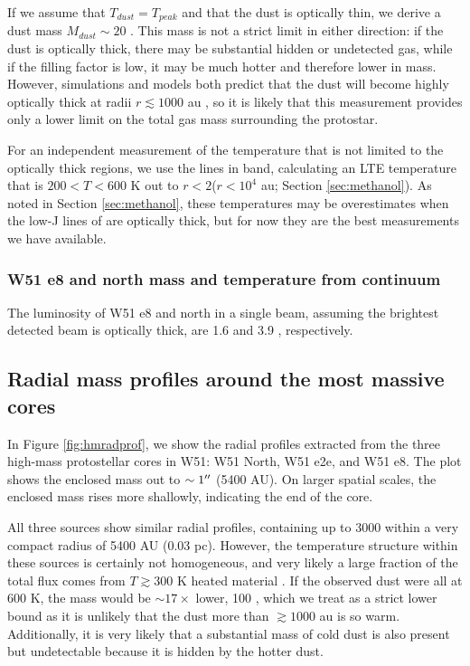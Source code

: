 \documentclass{aa}
\begin{document}
If we assume that $T_{dust} = T_{peak}$ and that the dust is optically thin, we
derive a dust mass $M_{dust}\sim20$ \msun.  This  mass is not a strict limit in
either direction: if the dust is optically thick, there may be substantial
hidden or undetected gas, while if the filling factor is low, it may be much
hotter and therefore lower in mass.  However, simulations and models both
predict that the dust will become highly optically thick at radii
$r\lesssim1000$ au \citep{Forgan2016a,Klassen2016a}, so it is likely that
this measurement provides only a lower limit on the total gas mass surrounding
the protostar.

For an independent measurement of the temperature that is not limited
to the optically thick regions, we use the \methanol
lines in band, calculating an LTE temperature that is $200 < T < 600$ K
out to $r<2$\arcsec ($r<10^4$ au; Section \ref{sec:methanol}).  As noted
in Section \ref{sec:methanol}, these temperatures may be overestimates
when the low-J lines of \methanol are optically thick, but for now they
are the best measurements we have available.

\subsubsection{W51 e8 and north mass and temperature from continuum}
\label{sec:w51e8andnorth}

The luminosity of W51 e8 and north in a single beam, assuming the brightest
detected beam is optically thick, are 1.6 and 3.9 \lsun,
respectively.




\subsection{Radial mass profiles around the most massive cores}
In Figure \ref{fig:hmradprof}, we show the radial profiles extracted from the
three high-mass protostellar cores in W51: W51 North, W51 e2e, and W51 e8.
The plot shows the enclosed mass out to $\sim1\mbox{$^{\prime\prime}$}$ (5400 AU).  On larger
spatial scales, the enclosed mass rises more shallowly, indicating the end of the
core.

All three sources show similar radial profiles, containing up to 3000 \msun
within a very compact radius of 5400 AU (0.03 pc).  However, the temperature
structure within these sources is certainly not homogeneous, and very likely a
large fraction of the total flux comes from $T\gtrsim300$ K heated material
\citep[Section \ref{sec:temperature}; ][]{Goddi2016a}.  If the observed dust were
all at 600 K, the mass would be $\sim17\times$ lower, 100 \msun, which we treat
as a strict lower bound as it is unlikely that the dust more than $\gtrsim1000$
au is so warm.  Additionally, it is very likely that a substantial mass of cold
dust is also present but undetectable because it is hidden by the hotter dust.
\end{document}
